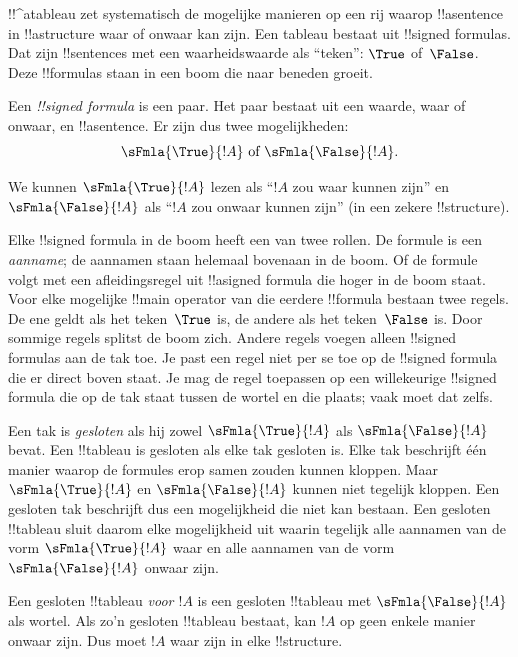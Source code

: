 \documentclass[../../../include/open-logic-section]{subfiles}
\begin{document}
      {}
      {}


!!^a{tableau} zet systematisch de mogelijke manieren op een rij
waarop !!a{sentence} in !!a{structure} waar of onwaar kan zijn. Een
tableau bestaat uit !!{signed formula}s. Dat zijn !!{sentence}s met
een waarheidswaarde als ``teken'': $\True$ of~$\False$. Deze
!!{formula}s staan in een boom die naar beneden groeit.

\begin{defn}
  Een \emph{!!{signed formula}} is een paar. Het paar bestaat uit een
  waarde, waar of onwaar, en !!a{sentence}. Er zijn dus twee
  mogelijkheden:
  \[
  \sFmla{\True}{!A} \text{ of } \sFmla{\False}{!A}.
  \]
\end{defn}

We kunnen $\sFmla{\True}{!A}$ lezen als ``$!A$ zou waar kunnen zijn''
en $\sFmla{\False}{!A}$ als ``$!A$ zou onwaar kunnen zijn'' (in een
zekere !!{structure}).

Elke !!{signed formula} in de boom heeft een van twee rollen. De
formule is een \emph{aanname}; de aannamen staan helemaal bovenaan in
de boom. Of de formule volgt met een afleidingsregel uit !!a{signed
formula} die hoger in de boom staat. Voor elke mogelijke
!!{main operator} van die eerdere
!!{formula} bestaan twee regels. De ene geldt als het teken~$\True$
is, de andere als het teken~$\False$ is. Door sommige regels splitst
de boom zich. Andere regels voegen alleen !!{signed formula}s aan de
tak toe. Je past een regel niet per se toe op de !!{signed formula}
die er direct boven staat. Je mag de regel toepassen op een
willekeurige !!{signed formula} die op de tak staat tussen de wortel
en die plaats; vaak moet dat zelfs.

Een tak is \emph{gesloten} als hij zowel $\sFmla{\True}{!A}$ als
$\sFmla{\False}{!A}$ bevat. Een !!{tableau} is gesloten als elke tak
gesloten is. Elke tak beschrijft één manier waarop de formules erop
samen zouden kunnen kloppen. Maar $\sFmla{\True}{!A}$ en
$\sFmla{\False}{!A}$ kunnen niet tegelijk kloppen. Een gesloten tak
beschrijft dus een mogelijkheid die niet kan bestaan. Een gesloten
!!{tableau} sluit daarom elke mogelijkheid uit
waarin tegelijk alle aannamen van de vorm $\sFmla{\True}{!A}$ waar en
alle aannamen van de vorm~$\sFmla{\False}{!A}$ onwaar zijn.

Een gesloten !!{tableau} \emph{voor $!A$} is een gesloten
!!{tableau} met $\sFmla{\False}{!A}$ als wortel. Als zo'n gesloten
!!{tableau} bestaat, kan $!A$ op geen enkele manier onwaar zijn. Dus
moet $!A$ waar zijn in elke !!{structure}.
\end{document}
